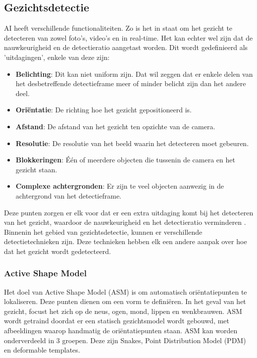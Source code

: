 \subsection{Gezichtsdetectie}
AI heeft verschillende functionaliteiten. Zo is het in staat om het gezicht te detecteren van zowel foto's, video's en in real-time. Het kan echter wel zijn dat de nauwkeurigheid en de detectieratio aangetast worden. Dit wordt gedefinieerd als 'uitdagingen', enkele van deze zijn:
\begin{itemize}
    \item \textbf{Belichting}: Dit kan niet uniform zijn. Dat wil zeggen dat er enkele delen van het desbetreffende detectieframe meer of minder belicht zijn dan het andere deel.
    \item \textbf{Oriëntatie}: De richting hoe het gezicht gepositioneerd is.
    \item \textbf{Afstand}: De afstand van het gezicht ten opzichte van de camera.
    \item \textbf{Resolutie}: De resolutie van het beeld waarin het detecteren moet gebeuren.
    \item \textbf{Blokkeringen}: Één of meerdere objecten die tussenin de camera en het gezicht staan.
    \item \textbf{Complexe achtergronden}: Er zijn te veel objecten aanwezig in de achtergrond van het detectieframe.
\end{itemize}
Deze punten zorgen er elk voor dat er een extra uitdaging komt bij het detecteren van het gezicht, waardoor de nauwkeurigheid en het detectieratio verminderen \autocite{Kumar2019}. Binnenin het gebied van gezichtsdetectie, kunnen er verschillende detectietechnieken zijn. Deze technieken hebben elk een andere aanpak over hoe dat het gezicht wordt gedetecteerd.

\subsubsection{Active Shape Model}
Het doel van Active Shape Model (ASM) is om automatisch oriëntatiepunten te lokaliseren. Deze punten dienen om een vorm te definiëren. In het geval van het gezicht, focust het zich op de neus, ogen, mond, lippen en wenkbrauwen. ASM wordt getraind doordat er een statisch gezichtsmodel wordt gebouwd, met afbeeldingen waarop handmatig de oriëntatiepunten staan. ASM kan worden onderverdeeld in 3 groepen. Deze zijn Snakes, Point Distribution Model (PDM) en deformable templates.

